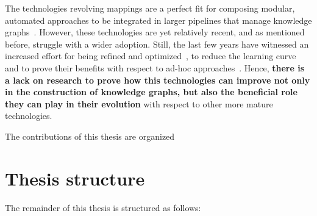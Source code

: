 The technologies revolving mappings are a perfect fit for composing modular, automated approaches to be integrated in larger pipelines that manage knowledge graphs~\citep{simsek2021knowledge,cimmino2022helio,grassi2023composable}. However, these technologies are yet relatively recent, and as mentioned before, struggle with a wider adoption. Still, the last few years have witnessed an increased effort for being refined and optimized~\citep{calvanese2017ontop,chaves2019parameters,arenas2022morphkgc,iglesias2023scaling}, to reduce the learning curve and to prove their benefits with respect to ad-hoc approaches~\citep{iglesias2019bio2rdf}. Hence, \textbf{there is a lack on research to prove how this technologies can improve not only in the construction of knowledge graphs, but also the beneficial role they can play in their evolution} with respect to other more mature technologies.  


The contributions of this thesis are organized 

\section{Thesis structure}

The remainder of this thesis is structured as follows:

